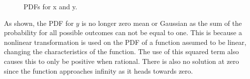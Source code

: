 \documentclass[11pt]{article}
\begin{document}
\begin{enumerate}[label=\textbf{\arabic*.}]
\begin{figure}[H]
    \caption{PDFs for x and y.}
  \end{figure}
  As shown, the PDF for $y$ is no longer zero mean or Gaussian as the sum of the 
  probability for all possible outcomes can not be equal to one. This is because a 
  nonlinear transformation is used on the PDF of a function assumed to be linear, 
  changing the characteristics of the function. The use of this squared term also 
  causes this to only be positive when rational. There is also no solution at 
  zero since the function approaches infinity as it heads towards zero.

\end{enumerate}
\end{document}
